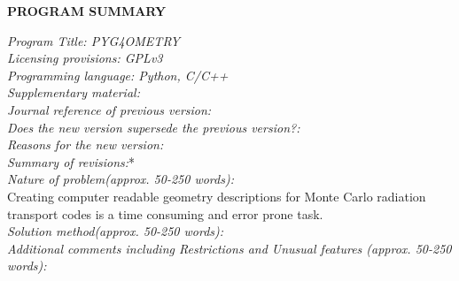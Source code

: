 \documentclass[final,5p,times,twocolumn]{elsarticle}
\begin{document}
{\bf PROGRAM SUMMARY}

\begin{small}
\noindent
{\em Program Title: PYG4OMETRY }                                         		\\
{\em Licensing provisions: GPLv3 }			\\
{\em Programming language: Python, C/C++}                         		\\

{\em Supplementary material:}                                 				\\
{\em Journal reference of previous version:}                  			\\
{\em Does the new version supersede the previous version?:}   	\\
{\em Reasons for the new version:}							\\
{\em Summary of revisions:}*								\\

{\em Nature of problem(approx. 50-250 words):}\\
Creating computer readable geometry descriptions for Monte Carlo radiation transport codes is a time consuming and error prone task.  \\
{\em Solution method(approx. 50-250 words):}\\
{\em Additional comments including Restrictions and Unusual features (approx. 50-250 words):}\\
   \\

\end{small}
\end{document}
